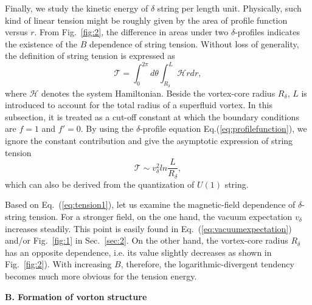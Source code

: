 \documentclass[12pt]{article}
\begin{document}
Finally, we study the kinetic energy of $\delta$ string per length unit. Physically, such kind of
linear tension might be roughly given by the area of profile function versus $r$. From Fig.~\ref{fig:2},
the difference in areas under two $\delta$-profiles indicates the existence of the $B$ dependence of
string tension.
Without loss of generality, the definition of string tension is expressed as
\begin{equation}
\mathcal{T} = \int^{2\pi}_{0}d\theta \int^L_{R_\delta}
\mathcal{H} rdr
\label{eq:tension},
\end{equation}
where $\mathcal{H}$ denotes the system Hamiltonian.
Beside the vortex-core radius $R_\delta$, $L$ is introduced to account for the total radius of a
superfluid vortex. In this subsection, it is treated as a cut-off constant at which the boundary
conditions are $f =1$ and $f' =0$.
By using the $\delta$-profile equation Eq.(\ref{eq:profilefunction}), we ignore the constant
contribution and give the asymptotic expression of string tension
\begin{equation}
  \label{eq:tension1}
  \mathcal{T} \sim v_\delta^2 ln\frac{L}{R_\delta},
\end{equation}
which can also be derived from the quantization of $U(1)$ string.

Based on Eq.~(\ref{eq:tension1}), let us examine the magnetic-field dependence of $\delta$-string tension.
For a stronger field, on the one hand, the vacuum expectation $v_\delta$ increases steadily.
This point is easily found in Eq.~(\ref{eq:vacuumexpectation}) and/or Fig.~\ref{fig:1} in Sec.~\ref{sec:2}.
On the other hand, the vortex-core radius $R_\delta$ has an opposite dependence, i.e. its value slightly
decreases as shown in Fig.~\ref{fig:2}). With increasing $B$, therefore, the logarithmic-divergent
tendency becomes much more obvious for the tension energy. 


\vspace{0.2cm}
\textbf{B. Formation of vorton structure }
\vspace{0.2cm}
\end{document}
